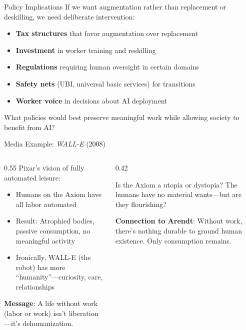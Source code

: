 ﻿\documentclass[aspectratio=169,11pt]{beamer}
\begin{document}
\begin{frame}{Policy Implications}
If we want augmentation rather than replacement or deskilling, we need deliberate intervention:

\vspace{0.2em}
\begin{itemize}
    \item \textbf{Tax structures} that favor augmentation over replacement
    \item \textbf{Investment} in worker training and reskilling
    \item \textbf{Regulations} requiring human oversight in certain domains
    \item \textbf{Safety nets} (UBI, universal basic services) for transitions
    \item \textbf{Worker voice} in decisions about AI deployment
\end{itemize}

\vspace{0.2em}
\begin{discussionbox}
\small
What policies would best preserve meaningful work while allowing society to benefit from AI?
\end{discussionbox}
\end{frame}

\begin{frame}{Media Example: \emph{WALL-E} (2008)}
\begin{columns}[T]
\begin{column}{0.55\textwidth}
Pixar's vision of fully automated leisure:
\begin{itemize}
    \item Humans on the Axiom have all labor automated
    \item Result: Atrophied bodies, passive consumption, no meaningful activity
    \item Ironically, WALL-E (the robot) has more ``humanity''---curiosity, care, relationships
\end{itemize}

\vspace{0.2em}
\textbf{Message}: A life without work (labor or work) isn't liberation---it's dehumanization.
\end{column}
\begin{column}{0.42\textwidth}
\begin{discussionbox}[Discussion]
\scriptsize
Is the Axiom a utopia or dystopia? The humans have no material wants---but are they flourishing?
\end{discussionbox}

\vspace{0.3em}
\textbf{Connection to Arendt}: Without work, there's nothing durable to ground human existence. Only consumption remains.
\end{column}
\end{columns}
\end{frame}
\end{document}
